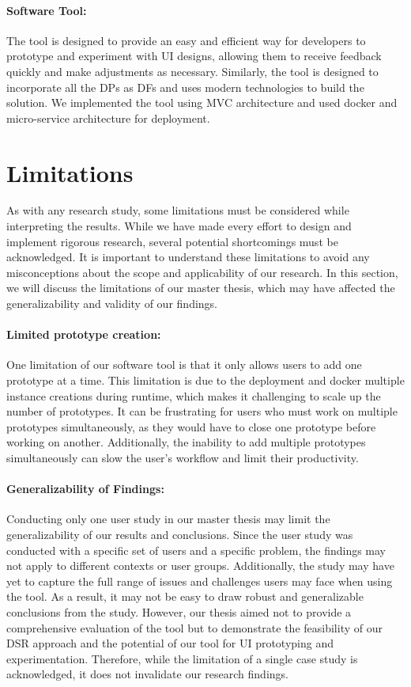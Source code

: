 \paragraph{Software Tool:}
The tool is designed to provide an easy and efficient way for developers to prototype and experiment with UI designs, allowing them to receive feedback quickly and make adjustments as necessary. 
Similarly, the tool is designed to incorporate all the DPs as DFs and uses modern technologies to build the solution. 
We implemented the tool using MVC architecture and used docker and micro-service architecture for deployment.
\clearpage

\section{Limitations}
\label{section:conclusion:limitations}
As with any research study, some limitations must be considered while interpreting the results. 
While we have made every effort to design and implement rigorous research, several potential shortcomings must be acknowledged.
It is important to understand these limitations to avoid any misconceptions about the scope and applicability of our research. 
In this section, we will discuss the limitations of our master thesis, which may have affected the generalizability and validity of our findings.

\paragraph{Limited prototype creation:}
One limitation of our software tool is that it only allows users to add one prototype at a time. 
This limitation is due to the deployment and docker multiple instance creations during runtime, which makes it challenging to scale up the number of prototypes. 
It can be frustrating for users who must work on multiple prototypes simultaneously, as they would have to close one prototype before working on another. 
Additionally, the inability to add multiple prototypes simultaneously can slow the user's workflow and limit their productivity.

\paragraph{Generalizability of Findings:}
Conducting only one user study in our master thesis may limit the generalizability of our results and conclusions. 
Since the user study was conducted with a specific set of users and a specific problem, the findings may not apply to different contexts or user groups. 
Additionally, the study may have yet to capture the full range of issues and challenges users may face when using the tool. 
As a result, it may not be easy to draw robust and generalizable conclusions from the study.
However, our thesis aimed not to provide a comprehensive evaluation of the tool but to demonstrate the feasibility of our DSR approach and the potential of our tool for UI prototyping and experimentation. 
Therefore, while the limitation of a single case study is acknowledged, it does not invalidate our research findings.

